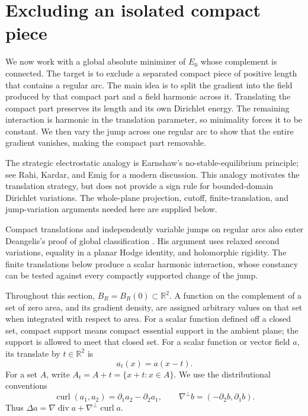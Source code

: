 \section{Excluding an isolated compact piece}
\label{sec:compact-piece}

We now work with a global absolute minimizer of $E_0$ whose complement is
connected. The target is to exclude a separated compact piece of positive
length that contains a regular arc. The main idea is to split the gradient into the
field produced by that compact part and a field harmonic across it. Translating
the compact part preserves its length and its own Dirichlet energy. The remaining
interaction is harmonic in the translation parameter, so minimality forces it
to be constant. We then vary the jump across one regular arc to show that the
entire gradient vanishes, making the compact part removable.

The strategic electrostatic analogy is Earnshaw's no-stable-equilibrium
principle; see Rahi, Kardar, and Emig \cite[pp.~1--2]{rahi_kardar_emig2009}
for a modern discussion.  This analogy motivates the translation strategy,
but does not provide a sign rule for bounded-domain Dirichlet variations.
The whole-plane projection, cutoff, finite-translation, and jump-variation
arguments needed here are supplied below.

Compact translations and independently variable jumps on regular arcs also
enter Deangelis's proof of global classification \cite{deangelis2026}.
His argument uses relaxed second variations, equality in a planar Hodge
identity, and holomorphic rigidity. The finite translations below produce
a scalar harmonic interaction, whose constancy can be tested against every
compactly supported change of the jump.

Throughout this section, $B_R=B_R(0)\subset\mathbb R^2$. A function on the
complement of a set of zero area, and its gradient density, are assigned arbitrary
values on that set when integrated with respect to area. For a scalar function
defined off a closed set, compact support means compact essential support
in the ambient plane; the support is allowed to meet that closed set.
For a scalar function
or vector field $a$, its translate by $t\in\mathbb R^2$ is
\[
 a_t(x)=a(x-t).
\]
For a set $A$, write $A_t=A+t=\{x+t:x\in A\}$.
We use the distributional conventions
\[
 \operatorname{curl}(a_1,a_2)=\partial_1a_2-\partial_2a_1,
 \qquad \nabla^\perp b=(-\partial_2b,\partial_1b).
\]
Thus $\Delta a=\nabla\operatorname{div}a+
\nabla^\perp\operatorname{curl}a$.

